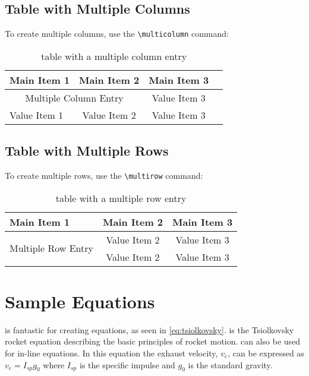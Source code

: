 \documentclass[]{nasa-latex-docs}
\begin{document}
\subsection{Table with Multiple Columns}

To create multiple columns, use the \texttt{\textbackslash multicolumn} command:

\begin{table}[H]
   \caption{\latex table with a multiple column entry}
   \label{tab:TabEx2}
   \begin{tabular}{lccr}
      \toprule[\heavyrulewidth]
      \toprule[\heavyrulewidth]
      \textbf{Main Item 1} & \textbf{Main Item 2} & \textbf{Main Item 3} \\
      \midrule
      \multicolumn{2}{c}{Multiple Column Entry}  & Value Item 3 \\
      Value Item 1 & Value Item 2 & Value Item 3\\
      \bottomrule[\heavyrulewidth]
   \end{tabular}
\end{table}

\subsection{Table with Multiple Rows}

To create multiple rows, use the \texttt{\textbackslash multirow} command:

\begin{table}[H]
   \caption{\latex table with a multiple row entry}
   \label{tab:TabEx3}
   \begin{tabular}{lcc}
      \toprule[\heavyrulewidth]
      \toprule[\heavyrulewidth]
      \textbf{Main Item 1} & \textbf{Main Item 2} & \textbf{Main Item 3} \\
      \midrule
      \multirow{2}{*}{Multiple Row Entry} & Value Item 2 & Value Item 3 \\
      & Value Item 2 & Value Item 3 \\
      \bottomrule[\heavyrulewidth]
   \end{tabular}
\end{table}

\section{Sample Equations}

\latex is fantastic for creating equations, as seen in \ref{eq:tsiolkovsky}.  is the Tsiolkovsky rocket equation describing the basic principles of rocket motion. \latex can also be used for in-line equations. In this equation the exhaust velocity, $v_e$, can be expressed as $v_e=I_{sp}g_0$ where $I_{sp}$ is the specific impulse and $g_0$ is the standard gravity.
\end{document}
